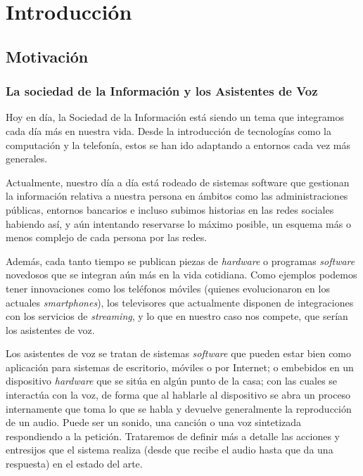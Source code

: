 \chapter{Introducción}

\noindent{}

\section{Motivación}

\subsection{La sociedad de la Información y los Asistentes de Voz}
Hoy en día, la Sociedad de la Información está siendo un tema que integramos cada día más en nuestra vida. Desde la introducción de tecnologías como la computación y la telefonía, estos se han ido adaptando a entornos cada vez más generales. 

Actualmente, nuestro día a día está rodeado de sistemas software que gestionan la información relativa a nuestra persona en ámbitos como las administraciones públicas, entornos bancarios e incluso subimos historias en las redes sociales habiendo así, y aún intentando reservarse lo máximo posible, un esquema más o menos complejo de cada persona por las redes.

Además, cada tanto tiempo se publican piezas de \textit{hardware} o programas \textit{software} novedosos que se integran aún más en la vida cotidiana. Como ejemplos podemos tener innovaciones como los teléfonos móviles (quienes evolucionaron en los actuales \textit{smartphones}), los televisores que actualmente disponen de integraciones con los servicios de \textit{streaming}, y lo que en nuestro caso nos compete, que serían los asistentes de voz.

Los asistentes de voz se tratan de sistemas \textit{software} que pueden estar bien como aplicación para sistemas de escritorio, móviles o por Internet; o embebidos en un dispositivo \textit{hardware} que se sitúa en algún punto de la casa; con las cuales se interactúa con la voz, de forma que al hablarle al dispositivo se abra un proceso internamente que toma lo que se habla y devuelve generalmente la reproducción de un audio. Puede ser un sonido, una canción o una voz sintetizada respondiendo a la petición. Trataremos de definir más a detalle las acciones y entresijos que el sistema realiza (desde que recibe el audio hasta que da una respuesta) en el estado del arte.

